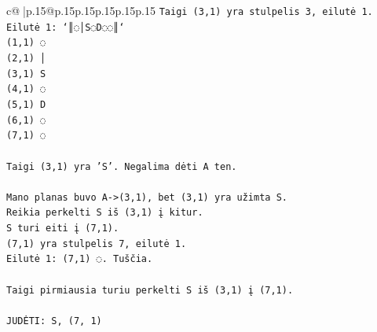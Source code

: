 \documentclass{article}
\begin{document}
{\begin{supertabular}{c@{$\;$}|p{.15\linewidth}@{}p{.15\linewidth}p{.15\linewidth}p{.15\linewidth}p{.15\linewidth}p{.15\linewidth}}
{{{\texttt{Taigi (3,1) yra stulpelis 3, eilutė 1.} \\
\texttt{Eilutė 1: `║◌│S◌D◌◌║`} \\
\texttt{(1,1) ◌} \\
\texttt{(2,1) │} \\
\texttt{(3,1) S} \\
\texttt{(4,1) ◌} \\
\texttt{(5,1) D} \\
\texttt{(6,1) ◌} \\
\texttt{(7,1) ◌} \\
\\ 
\texttt{Taigi (3,1) yra 'S'. Negalima dėti A ten.} \\
\\ 
\texttt{Mano planas buvo A{-}>(3,1), bet (3,1) yra užimta S.} \\
\texttt{Reikia perkelti S iš (3,1) į kitur.} \\
\texttt{S turi eiti į (7,1).} \\
\texttt{(7,1) yra stulpelis 7, eilutė 1.} \\
\texttt{Eilutė 1: (7,1) ◌. Tuščia.} \\
\\ 
\texttt{Taigi pirmiausia turiu perkelti S iš (3,1) į (7,1).} \\
\\ 
\texttt{JUDĖTI: S, (7, 1)} \\
            }
        }
    }
     \\ \\


\end{supertabular}}
\end{document}
